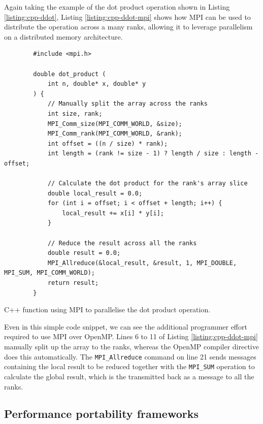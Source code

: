 Again taking the example of the dot product operation shown in Listing \ref{listing:cpp-ddot}, Listing \ref{listing:cpp-ddot-mpi} shows how MPI can be used to distribute the operation across a many ranks, allowing it to leverage parallelism on a distributed memory architecture.

\begin{code}
    \begin{verbatim}
        #include <mpi.h>
        
        double dot_product (
            int n, double* x, double* y
        ) {
            // Manually split the array across the ranks
            int size, rank;
            MPI_Comm_size(MPI_COMM_WORLD, &size);
            MPI_Comm_rank(MPI_COMM_WORLD, &rank);
            int offset = ((n / size) * rank);
            int length = (rank != size - 1) ? length / size : length - offset;
        
            // Calculate the dot product for the rank's array slice
            double local_result = 0.0;
            for (int i = offset; i < offset + length; i++) {
                local_result += x[i] * y[i];
            }
        
            // Reduce the result across all the ranks
            double result = 0.0;
            MPI_Allreduce(&local_result, &result, 1, MPI_DOUBLE, MPI_SUM, MPI_COMM_WORLD);
            return result;
        }
    \end{verbatim}
    \caption{C++ function using MPI to parallelise the dot product operation.}
    \label{listing:cpp-ddot-mpi}
\end{code}

Even in this simple code snippet, we can see the additional programmer effort required to use MPI over OpenMP. Lines 6 to 11 of Listing \ref{listing:cpp-ddot-mpi} manually split up the array to the ranks, whereas the OpenMP compiler directive does this automatically. The \texttt{MPI_Allreduce} command on line 21 sends messages containing the local result to be reduced together with the \texttt{MPI_SUM} operation to calculate the global result, which is the transmitted back as a message to all the ranks.

\subsection{Performance portability frameworks}
\label{ssec:performance-portability-frameworks}

